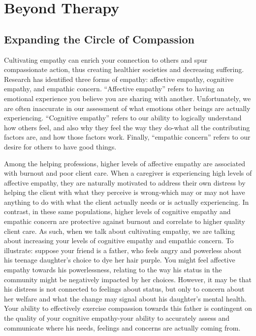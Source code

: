 \documentclass[12pt,letterpaper]{book}
\begin{document}
\chapter{Beyond Therapy}
\section{Expanding the Circle of Compassion}
\label{sec:circle}
Cultivating empathy can enrich your connection to others and spur compassionate action, thus creating healthier societies and decreasing suffering. Research has identified three forms of empathy: affective empathy, cognitive empathy, and empathic concern. “Affective empathy” refers to having an emotional experience you believe you are sharing with another. Unfortunately, we are often inaccurate in our assessment of what emotions other beings are actually experiencing. “Cognitive empathy” refers to our ability to logically understand how others feel, and also why they feel the way they do-what all the contributing factors are, and how those factors work. Finally, “empathic concern” refers to our desire for others to have good things.

Among the helping professions, higher levels of affective empathy are associated with burnout and poor client care. When a caregiver is experiencing high levels of affective empathy, they are naturally motivated to address their own distress by helping the client with what they perceive is wrong-which may or may not have anything to do with what the client actually needs or is actually experiencing. In contrast, in these same populations, higher levels of cognitive empathy and empathic concern are protective against burnout and correlate to higher quality client care. As such, when we talk about cultivating empathy, we are talking about increasing your levels of cognitive empathy and empathic concern. To illustrate: suppose your friend is a father, who feels angry and powerless about his teenage daughter's choice to dye her hair purple. You might feel affective empathy towards his powerlessness, relating to the way his status in the community might be negatively impacted by her choices. However, it may be that his distress is not connected to feelings about status, but only to concern about her welfare and what the change may signal about his daughter's mental health. Your ability to effectively exercise compassion towards this father is contingent on the quality of your cognitive empathy-your ability to accurately assess and communicate where his needs, feelings and concerns are actually coming from.
\end{document}
